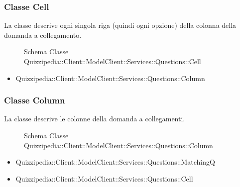 \subsubsection{Classe Cell}
La classe descrive ogni singola riga (quindi ogni opzione) della colonna della domanda a collegamento.
\begin{figure}[H]
\centering
\noindent{}
\caption{Schema Classe Quizzipedia::Client::ModelClient::Services::Questions::Cell}
\end{figure}
\begin{itemize}
\item Quizzipedia::Client::ModelClient::Services::Questions::Column
\end{itemize}
\subsubsection{Classe Column}
La classe descrive le colonne della domanda a collegamenti.
\begin{figure}[H]
\centering
\noindent{}
\caption{Schema Classe Quizzipedia::Client::ModelClient::Services::Questions::Column}
\end{figure}
\begin{itemize}
\item Quizzipedia::Client::ModelClient::Services::Questions::MatchingQ
\end{itemize}
\begin{itemize}
\item Quizzipedia::Client::ModelClient::Services::Questions::Cell
\end{itemize}

